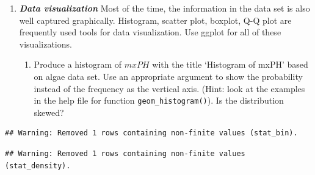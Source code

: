 \documentclass[]{article}
\newenvironment{Shaded}{\begin{snugshade}}{\end{snugshade}}
\newcommand{\KeywordTok}[1]{\textcolor[rgb]{0.13,0.29,0.53}{\textbf{#1}}}
\newcommand{\DataTypeTok}[1]{\textcolor[rgb]{0.13,0.29,0.53}{#1}}
\newcommand{\DecValTok}[1]{\textcolor[rgb]{0.00,0.00,0.81}{#1}}
\newcommand{\StringTok}[1]{\textcolor[rgb]{0.31,0.60,0.02}{#1}}
\newcommand{\CommentTok}[1]{\textcolor[rgb]{0.56,0.35,0.01}{\textit{#1}}}
\newcommand{\OperatorTok}[1]{\textcolor[rgb]{0.81,0.36,0.00}{\textbf{#1}}}
\newcommand{\NormalTok}[1]{#1}
\providecommand{\tightlist}{%
  \setlength{\itemsep}{0pt}\setlength{\parskip}{0pt}}
\begin{document}
\begin{enumerate}
\def\labelenumi{\arabic{enumi}.}
\setcounter{enumi}{1}
\item
  \textbf{\emph{Data visualization}} Most of the time, the information
  in the data set is also well captured graphically. Histogram, scatter
  plot, boxplot, Q-Q plot are frequently used tools for data
  visualization. Use ggplot for all of these visualizations.

  \begin{enumerate}
  \tightlist
  \item
    Produce a histogram of \(mxPH\) with the title `Histogram of mxPH'
    based on algae data set. Use an appropriate argument to show the
    probability instead of the frequency as the vertical axis. (Hint:
    look at the examples in the help file for function
    \texttt{geom\_histogram()}). Is the distribution skewed?
  \end{enumerate}
\end{enumerate}

\begin{Shaded}
\end{Shaded}

\begin{verbatim}
## Warning: Removed 1 rows containing non-finite values (stat_bin).
\end{verbatim}

\begin{verbatim}
## Warning: Removed 1 rows containing non-finite values (stat_density).
\end{verbatim}
\end{document}
